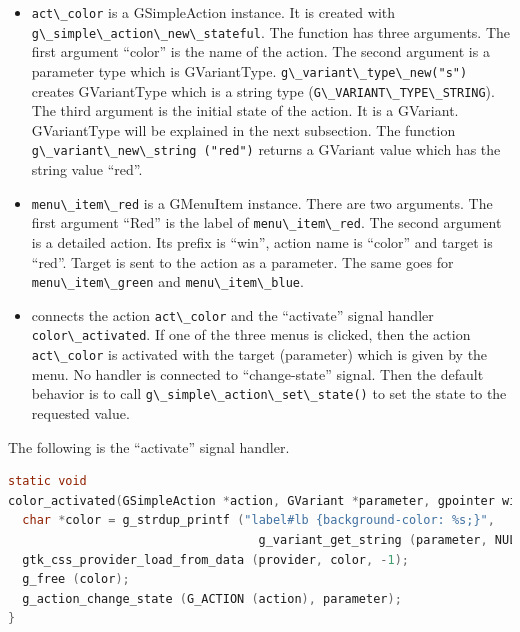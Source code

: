 \begin{itemize}
\tightlist
\item
  \passthrough{\lstinline!act\_color!} is a GSimpleAction instance. It
  is created with
  \passthrough{\lstinline!g\_simple\_action\_new\_stateful!}. The
  function has three arguments. The first argument ``color'' is the name
  of the action. The second argument is a parameter type which is
  GVariantType. \passthrough{\lstinline!g\_variant\_type\_new("s")!}
  creates GVariantType which is a string type
  (\passthrough{\lstinline!G\_VARIANT\_TYPE\_STRING!}). The third
  argument is the initial state of the action. It is a GVariant.
  GVariantType will be explained in the next subsection. The function
  \passthrough{\lstinline!g\_variant\_new\_string ("red")!} returns a
  GVariant value which has the string value ``red''.
\item
  \passthrough{\lstinline!menu\_item\_red!} is a GMenuItem instance.
  There are two arguments. The first argument ``Red'' is the label of
  \passthrough{\lstinline!menu\_item\_red!}. The second argument is a
  detailed action. Its prefix is ``win'', action name is ``color'' and
  target is ``red''. Target is sent to the action as a parameter. The
  same goes for \passthrough{\lstinline!menu\_item\_green!} and
  \passthrough{\lstinline!menu\_item\_blue!}.
\item
  connects the action \passthrough{\lstinline!act\_color!} and the
  ``activate'' signal handler
  \passthrough{\lstinline!color\_activated!}. If one of the three menus
  is clicked, then the action \passthrough{\lstinline!act\_color!} is
  activated with the target (parameter) which is given by the menu. No
  handler is connected to ``change-state'' signal. Then the default
  behavior is to call
  \passthrough{\lstinline!g\_simple\_action\_set\_state()!} to set the
  state to the requested value.
\end{itemize}

The following is the ``activate'' signal handler.

\begin{lstlisting}[language=C]
static void
color_activated(GSimpleAction *action, GVariant *parameter, gpointer win) {
  char *color = g_strdup_printf ("label#lb {background-color: %s;}",
                                   g_variant_get_string (parameter, NULL));
  gtk_css_provider_load_from_data (provider, color, -1);
  g_free (color);
  g_action_change_state (G_ACTION (action), parameter);
}
\end{lstlisting}

